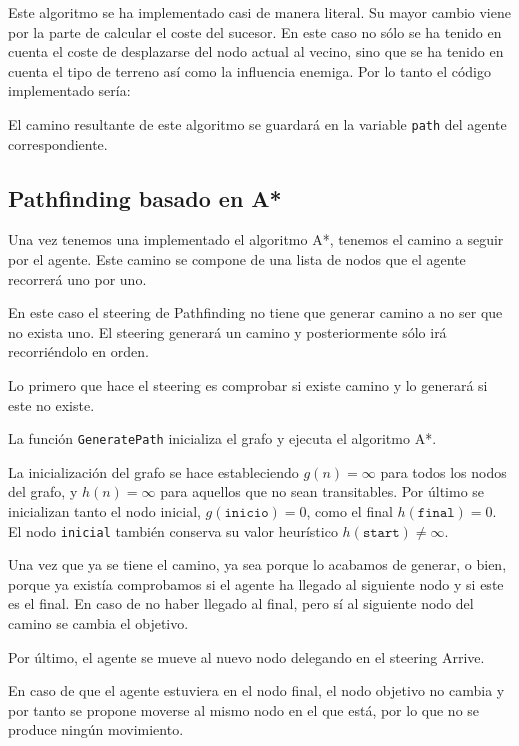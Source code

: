 Este algoritmo se ha implementado casi de manera literal. Su mayor cambio viene por la parte de calcular el coste del sucesor. En este caso no sólo se ha tenido en cuenta el coste de desplazarse del nodo actual al vecino, sino que se ha tenido en cuenta el tipo de terreno así como la influencia enemiga. Por lo tanto el código implementado sería:



El camino resultante de este algoritmo se guardará en la variable \texttt{path} del agente correspondiente. 

\subsection{Pathfinding basado en A*}

Una vez tenemos una implementado el algoritmo A*, tenemos el camino a seguir por el agente. Este camino se compone de una lista de nodos que el agente recorrerá uno por uno.

En este caso el steering de Pathfinding no tiene que generar camino a no ser que no exista uno. El steering generará un camino y posteriormente sólo irá recorriéndolo en orden.

Lo primero que hace el steering es comprobar si existe camino y lo generará si este no existe.



La función \texttt{GeneratePath} inicializa el grafo y ejecuta el algoritmo A*.



La inicialización del grafo se hace estableciendo $g(n) = \infty$ para todos los nodos del grafo, y $h(n) = \infty$ para aquellos que no sean transitables. Por último se inicializan tanto el nodo inicial, $g(\texttt{inicio}) = 0$, como el final $h(\texttt{final}) = 0$. El nodo \texttt{inicial} también conserva su valor heurístico $h(\texttt{start}) \neq \infty$.



Una vez que ya se tiene el camino, ya sea porque lo acabamos de generar, o bien, porque ya existía comprobamos si el agente ha llegado al siguiente nodo y si este es el final. En caso de no haber llegado al final, pero sí al siguiente nodo del camino se cambia el objetivo.



Por último, el agente se mueve al nuevo nodo delegando en el steering Arrive.



En caso de que el agente estuviera en el nodo final, el nodo objetivo no cambia y por tanto se propone moverse al mismo nodo en el que está, por lo que no se produce ningún movimiento.

